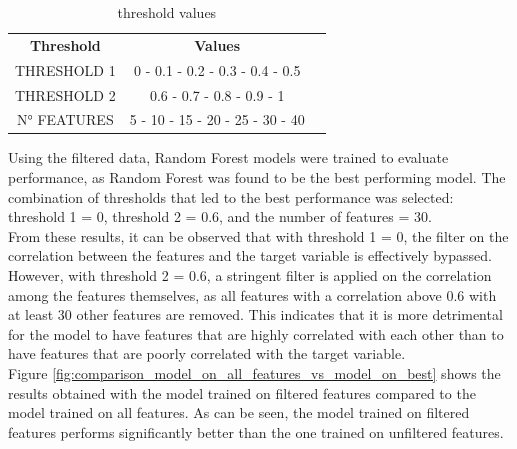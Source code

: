 \begin{table}[h]
    \centering
    \small
    \begin{tabular}{|c|c|c|}
        \hline
        \textbf{Threshold} & \textbf{Values}                 \\
        THRESHOLD 1        & 0 - 0.1 - 0.2 - 0.3 - 0.4 - 0.5 \\
        THRESHOLD 2        & 0.6 - 0.7 - 0.8 - 0.9 - 1       \\
        N° FEATURES        & 5 - 10 - 15 - 20 - 25 - 30 - 40 \\
        \hline
    \end{tabular}
    \caption{threshold values}
    \label{tab:threshold_values}
\end{table}
\noindent
Using the filtered data, Random Forest models were trained to evaluate performance, as Random Forest was found to be the best performing model.
The combination of thresholds that led to the best performance was selected: threshold 1 = 0, threshold 2 = 0.6, and the number of features = 30.\\
From these results, it can be observed that with threshold 1 = 0, the filter on the correlation between the features and the target variable is effectively bypassed.
However, with threshold 2 = 0.6, a stringent filter is applied on the correlation among the features themselves, as all features with a correlation above 0.6
with at least 30 other features are removed. This indicates that it is more detrimental for the model to have features that are highly correlated
with each other than to have features that are poorly correlated with the target variable.\\
Figure \ref{fig:comparison_model_on_all_features_vs_model_on_best} shows the results obtained with the model trained on filtered features
compared to the model trained on all features. As can be seen, the model trained on filtered features performs significantly
better than the one trained on unfiltered features.

